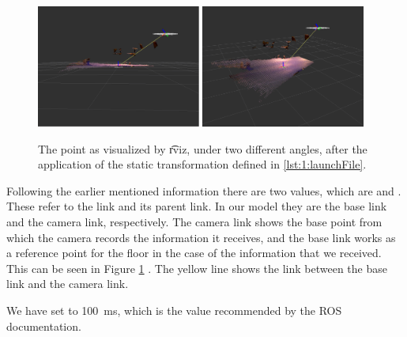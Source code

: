 \begin{figure}
	\centering
	\includegraphics[width=0.48\textwidth]{./img/Assignment1_1}
	\includegraphics[width=0.48\textwidth]{./img/Assignment1_2}	
	\caption{The point as visualized by \t{rviz}, under two different angles, after the application of the static transformation defined in \cref{lst:1:launchFile}.}
	\label{fig:1:finalResult}
\end{figure}


Following the earlier mentioned information there are two values, which are   and . These refer to the link and its parent link. In our model they are the base link and the camera link, respectively. The camera link shows the base point from which the camera records the information it receives, and the base link works as a reference point for the floor in the case of the information that we received. This can be seen in Figure \ref{fig:1:finalResult} . The yellow line shows the link between the base link and the camera link.

We have set  to \SI{100}{\milli\second}, which is the value recommended by the ROS documentation. 

